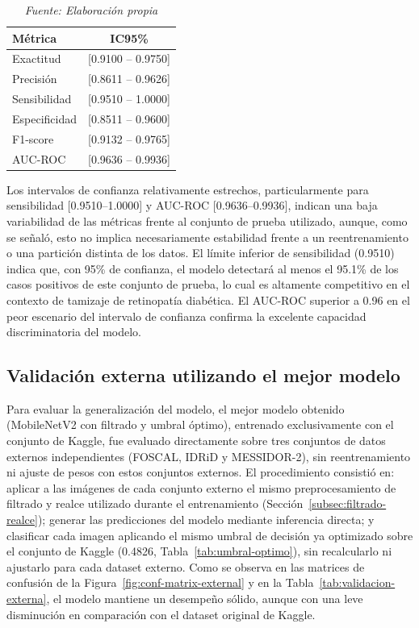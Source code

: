 \begin{table}[ht!]
	\centering
	\renewcommand{\arraystretch}{1.2}
	\caption{Intervalos de confianza (IC95\%) de las métricas de desempeño para el 
mejor modelo (MobileNetV2 con filtrado y umbral óptimo)}
	\label{tab:bootstrap-ic}
	\begin{tabular}{lc}
		\hline
		Métrica & IC95\% \\ \hline
		Exactitud & [0.9100 -- 0.9750] \\
		Precisión & [0.8611 -- 0.9626] \\
		Sensibilidad & [0.9510 -- 1.0000] \\
		Especificidad & [0.8511 -- 0.9600] \\
		F1-score & [0.9132 -- 0.9765] \\
		AUC-ROC & [0.9636 -- 0.9936] \\
		\hline
	\end{tabular}
	\caption*{\textit{Fuente: Elaboración propia}}
\end{table}

Los intervalos de confianza relativamente estrechos, particularmente para sensibilidad
[0.9510--1.0000] y AUC-ROC [0.9636--0.9936], indican una baja variabilidad de las
métricas frente al conjunto de prueba utilizado, aunque, como se señaló, esto no implica
necesariamente estabilidad frente a un reentrenamiento o una partición distinta de los
datos. El límite inferior de sensibilidad (0.9510) indica que, con 95\% de confianza, el
modelo detectará al menos el 95.1\% de los casos positivos de este conjunto de prueba, lo
cual es altamente competitivo en el contexto de tamizaje de retinopatía diabética. El
AUC-ROC superior a 0.96 en el peor escenario del intervalo de confianza confirma la
excelente capacidad 
discriminatoria del modelo.

\subsection{Validación externa utilizando el mejor modelo} \label{subsec:validacion-externa}

Para evaluar la generalización del modelo, el mejor modelo obtenido (MobileNetV2 con
filtrado y umbral óptimo), entrenado exclusivamente con el conjunto de Kaggle, fue
evaluado directamente sobre tres conjuntos de datos externos independientes (FOSCAL,
IDRiD y MESSIDOR-2), sin reentrenamiento ni ajuste de pesos con estos conjuntos
externos. El procedimiento consistió en: aplicar a las imágenes de cada conjunto externo
el mismo preprocesamiento de filtrado y realce utilizado durante el entrenamiento
(Sección~\ref{subsec:filtrado-realce}); generar las predicciones del modelo mediante
inferencia directa; y clasificar cada imagen aplicando el mismo umbral de decisión ya
optimizado sobre el conjunto de Kaggle (0.4826, Tabla~\ref{tab:umbral-optimo}), sin
recalcularlo ni ajustarlo para cada dataset externo. Como se observa en las matrices de
confusión de la
Figura~\ref{fig:conf-matrix-external} y en la Tabla~\ref{tab:validacion-externa}, el 
modelo mantiene un desempeño sólido, aunque con una leve disminución en comparación con 
el dataset original de Kaggle.

